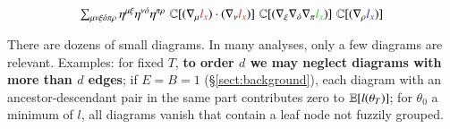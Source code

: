                     $$\sixsum \eta^{\mu\xi} \eta^{\nu\omicron} \eta^{\pi\rho} \, \ww{(\rRr{\AAA l_x}) \cdot (\rRr{\BBB l_x})}       \ww{(\gGg{\CCC \DDD \EEE l_x})} \ww{(\bBb{     \FFF l_x})}$$

            There are dozens of small diagrams.  In many analyses, only a few
            diagrams are relevant.  Examples: for fixed $T$, \textbf{to order
            $d$ we may neglect diagrams with more than $d$ edges};
            if $E=B=1$ (\S\ref{sect:background}), each diagram with an ancestor-descendant pair in the
            same part contributes zero to $\mathbb{E}[l(\theta_T)]$; for $\theta_0$ a minimum of
            $l$, all diagrams vanish that contain a leaf node
            not fuzzily grouped.%

